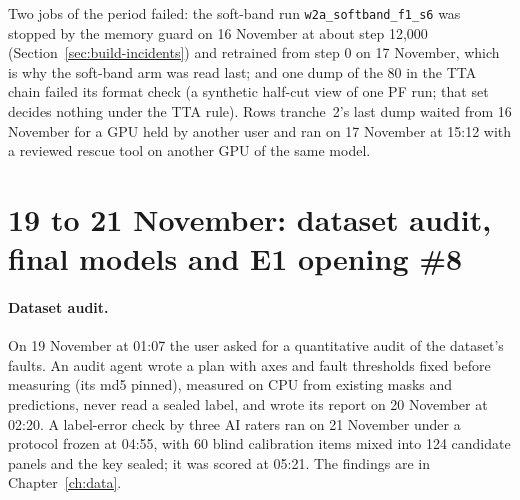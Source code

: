 Two jobs of the period failed: the soft-band run \texttt{w2a\_softband\_f1\_s6} was stopped by the memory guard
on 16 November at about step 12,000 (Section~\ref{sec:build-incidents}) and retrained from step 0 on 17 November, which is why the
soft-band arm was read last; and one dump of the 80 in the TTA chain failed its format check (a synthetic half-cut view of one PF
run; that set decides nothing under the TTA rule). Rows tranche~2's last dump waited from 16 November for a GPU held by another user and ran on 17 November
at 15:12 with a reviewed rescue tool on another GPU of the same model.

\section{19 to 21 November: dataset audit, final models and E1 opening \#8}\label{sec:build-final}

\paragraph{Dataset audit.} On 19 November at 01:07 the user asked for a quantitative audit of the dataset's faults. An audit agent
wrote a plan with axes and fault thresholds fixed before measuring (its md5 pinned), measured on CPU from existing masks and
predictions, never read a sealed label, and wrote its report on 20 November at 02:20. A label-error check by three AI raters ran on
21 November under a protocol frozen at 04:55, with 60 blind calibration items mixed into 124 candidate panels and the key sealed; it
was scored at 05:21. The findings are in Chapter~\ref{ch:data}.

